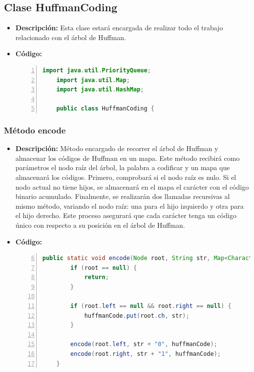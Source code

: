 \documentclass{article}
\begin{document}
  \subsection{Clase HuffmanCoding}
  \begin{itemize}
    \item \textbf{Descripción: }Esta clase estará encargada de realizar todo el trabajo relacionado con el árbol de Huffman.
    \item \textbf{Código: }
    \begin{lstlisting}[language=java, numbers=left, firstnumber=1, numberstyle=\color{orange}]
    import java.util.PriorityQueue;
    import java.util.Map;
    import java.util.HashMap;

    public class HuffmanCoding {
    \end{lstlisting}
  \end{itemize}
  \subsubsection{Método encode}
  \begin{itemize}
    \item \textbf{Descripción: }Método encargado de recorrer el árbol de Huffman y almacenar los códigos de 
    Huffman en un mapa. Este método recibirá como parámetros el nodo raíz del árbol, la palabra a codificar y 
    un mapa que almacenará los códigos. Primero, comprobará si el nodo raíz es nulo. Si el nodo actual no tiene 
    hijos, se almacenará en el mapa el carácter con el código binario acumulado. Finalmente, se realizarán dos 
    llamadas recursivas al mismo método, variando el nodo raíz: una para el hijo izquierdo y otra para el hijo 
    derecho. Este proceso asegurará que cada carácter tenga un código único con respecto a su posición en el árbol de Huffman.
    \item \textbf{Código: }
    \begin{lstlisting}[language=java, numbers=left, firstnumber=6, numberstyle=\color{orange}]
    public static void encode(Node root, String str, Map<Character, String> huffmanCode) {
        if (root == null) {
            return;
        }

        if (root.left == null && root.right == null) {
            huffmanCode.put(root.ch, str);
        }

        encode(root.left, str + "0", huffmanCode);
        encode(root.right, str + "1", huffmanCode);
    }
    \end{lstlisting}
  \end{itemize}
\end{document}
